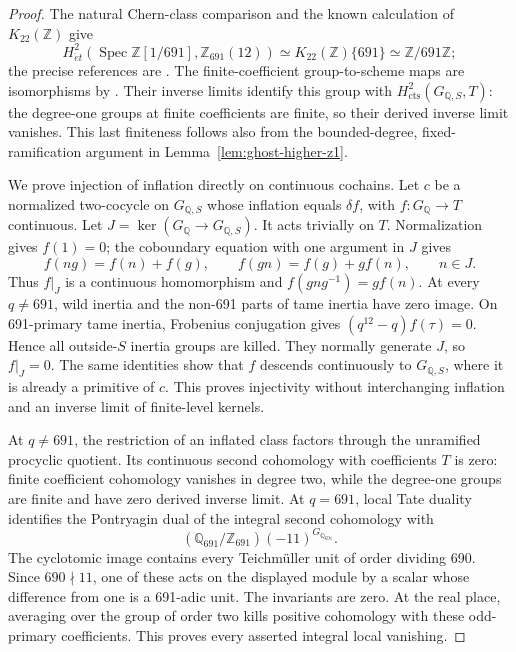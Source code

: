 \begin{proof}
The natural Chern-class comparison and the known calculation
of \(K_{22}(\mathbb Z)\) give
\[
 H^2_{\acute et}(\operatorname{Spec}\mathbb Z[1/691],
                  \mathbb Z_{691}(12))
       \simeq K_{22}(\mathbb Z)\{691\}
       \simeq\mathbb Z/691\mathbb Z;
\]
the precise references are \cite[VI.8.2 and VI.10.3]{GhostWeibelKbook}.
The finite-coefficient group-to-scheme maps are isomorphisms by
\cite[II.2.9]{GhostMilneADT}. Their inverse limits identify this
group with \(H^2_{\mathrm{cts}}(G_{\mathbb Q,S},T)\): the
degree-one groups at finite coefficients are finite, so their
derived inverse limit vanishes. This last finiteness follows
also from the bounded-degree, fixed-ramification argument in
Lemma~\ref{lem:ghost-higher-z1}.

We prove injection of inflation directly on continuous cochains.
Let \(c\) be a normalized two-cocycle on \(G_{\mathbb Q,S}\)
whose inflation equals \(\delta f\), with
\(f:G_{\mathbb Q}\to T\) continuous. Let
\(J=\ker(G_{\mathbb Q}\to G_{\mathbb Q,S})\). It acts
trivially on \(T\). Normalization gives \(f(1)=0\); the
coboundary equation with one argument in \(J\) gives
\[
 f(ng)=f(n)+f(g),\qquad
 f(gn)=f(g)+g f(n),\qquad n\in J.
\]
Thus \(f|_J\) is a continuous homomorphism and
\(f(gng^{-1})=g f(n)\). At every \(q\ne691\), wild inertia
and the non-691 parts of tame inertia have zero image. On
691-primary tame inertia, Frobenius conjugation gives
\((q^{12}-q)f(\tau)=0\). Hence all outside-\(S\) inertia
groups are killed. They normally generate \(J\), so \(f|_J=0\).
The same identities show that \(f\) descends continuously to
\(G_{\mathbb Q,S}\), where it is already a primitive of \(c\).
This proves injectivity without interchanging inflation and
an inverse limit of finite-level kernels.

At \(q\ne691\), the restriction of an inflated class factors
through the unramified procyclic quotient. Its continuous
second cohomology with coefficients \(T\) is zero: finite
coefficient cohomology vanishes in degree two, while the
degree-one groups are finite and have zero derived inverse
limit. At \(q=691\), local Tate duality
\cite[I.2.3]{GhostMilneADT} identifies the Pontryagin dual of
the integral second cohomology with
\[
       (\mathbb Q_{691}/\mathbb Z_{691})(-11)^{G_{\mathbb Q_{691}}}.
\]
The cyclotomic image contains every Teichm\"uller unit of order
dividing 690. Since \(690\nmid11\), one of these acts on the
displayed module by a scalar whose difference from one is a
691-adic unit. The invariants are zero. At the real place,
averaging over the group of order two kills positive cohomology
with these odd-primary coefficients. This proves every asserted
integral local vanishing.


\end{proof}
